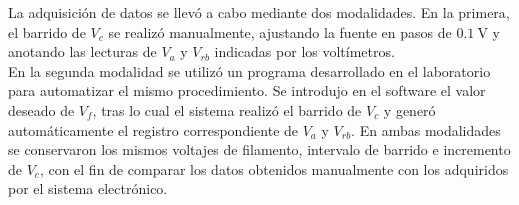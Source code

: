 La adquisición de datos se llevó a cabo mediante dos modalidades. En la 
primera, el barrido de \(V_c\) se realizó manualmente, ajustando la fuente 
en pasos de \(0.1~\mathrm{V}\) y anotando las lecturas de \(V_a\) y 
\(V_{rb}\) indicadas por los voltímetros.\\

En la segunda modalidad se utilizó un programa desarrollado en el 
laboratorio para automatizar el mismo procedimiento. Se introdujo en el 
software el valor deseado de \(V_f\), tras lo cual el sistema realizó el 
barrido de \(V_c\) y generó automáticamente el registro correspondiente de 
\(V_a\) y \(V_{rb}\). En ambas modalidades se conservaron los mismos 
voltajes de filamento, intervalo de barrido e incremento de \(V_c\), con 
el fin de comparar los datos obtenidos manualmente con los adquiridos por el sistema electrónico.


